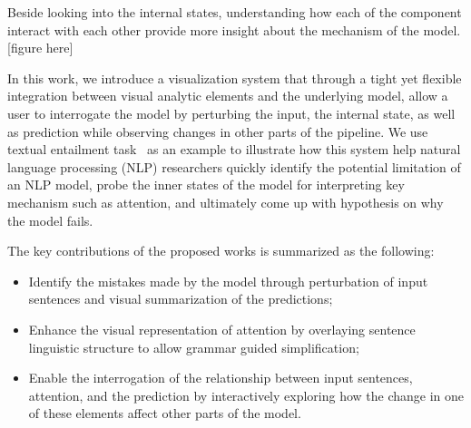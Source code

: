 Beside looking into the internal states, understanding how each of the component interact with each other provide more insight about the mechanism of the model.
[figure here]

In this work, we introduce a visualization system that through a tight yet flexible integration between visual analytic elements and the underlying model, allow a user to interrogate the model by perturbing the input, the internal state, as well as prediction while observing changes in other parts of the pipeline.
We use textual entailment task~\cite{BowmanAngeliPotts2015} as an example to illustrate how this system help natural language processing (NLP) researchers quickly identify the potential limitation of an NLP model, probe the inner states of the model for interpreting key mechanism such as attention, and ultimately come up with hypothesis on why the model fails.

%
%


The key contributions of the proposed works is summarized as the following:
\begin{itemize}
    \item Identify the mistakes made by the model through perturbation of input sentences and visual summarization of the predictions;

    \item Enhance the visual representation of attention by overlaying sentence linguistic structure to allow grammar guided simplification;

    \item Enable the interrogation of the relationship between input sentences, attention, and the prediction by interactively exploring how the change in one of these elements affect other parts of the model.

\end{itemize}

%
%
